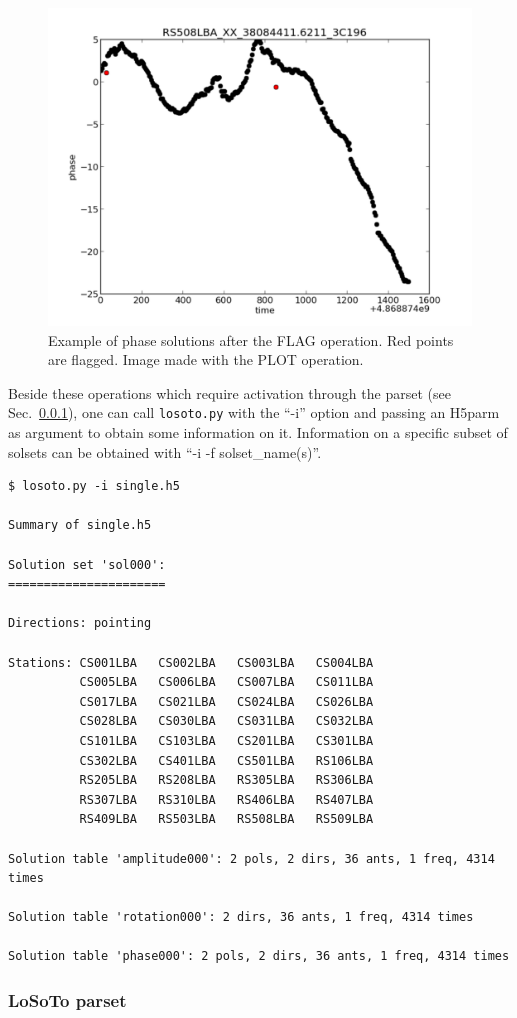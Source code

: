 \documentclass[]{article}
\begin{document}
\begin{figure}
\centering
\includegraphics[width=.5\columnwidth]{RS508LBA.pdf}
\caption{Example of phase solutions after the FLAG operation. Red points are flagged. Image made with the PLOT operation.}\label{fig:flag}
\end{figure}

Beside these operations which require activation through the \losoto{} parset (see Sec.~\ref{losoto:parset}), one can call \texttt{losoto.py} with the ``-i'' option and passing an H5parm as argument to obtain some information on it. Information on a specific subset of solsets can be obtained with ``-i -f solset\_name(s)''.

\begin{verbatim}
$ losoto.py -i single.h5

Summary of single.h5

Solution set 'sol000':
======================

Directions: pointing

Stations: CS001LBA   CS002LBA   CS003LBA   CS004LBA
          CS005LBA   CS006LBA   CS007LBA   CS011LBA
          CS017LBA   CS021LBA   CS024LBA   CS026LBA
          CS028LBA   CS030LBA   CS031LBA   CS032LBA
          CS101LBA   CS103LBA   CS201LBA   CS301LBA
          CS302LBA   CS401LBA   CS501LBA   RS106LBA
          RS205LBA   RS208LBA   RS305LBA   RS306LBA
          RS307LBA   RS310LBA   RS406LBA   RS407LBA
          RS409LBA   RS503LBA   RS508LBA   RS509LBA

Solution table 'amplitude000': 2 pols, 2 dirs, 36 ants, 1 freq, 4314 times

Solution table 'rotation000': 2 dirs, 36 ants, 1 freq, 4314 times

Solution table 'phase000': 2 pols, 2 dirs, 36 ants, 1 freq, 4314 times
\end{verbatim}

\subsubsection{LoSoTo parset}
\label{losoto:parset}
\end{document}
